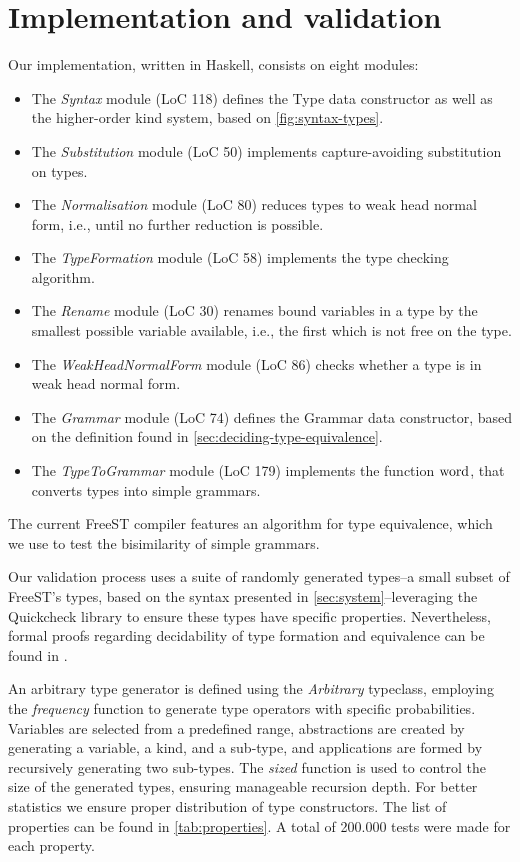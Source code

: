 \section{Implementation and validation}\label{sec:implementation}
Our implementation, written in Haskell, consists on eight modules:
\begin{itemize}
    \item The \emph{Syntax} module (LoC 118) defines the Type data constructor as well as the higher-order kind system, based on \cref*{fig:syntax-types}. 
    \item The \emph{Substitution} module (LoC 50) implements capture-avoiding substitution on types.
    \item The \emph{Normalisation} module (LoC 80) reduces types to weak head normal form, i.e., until no further reduction is possible.
    \item The \emph{TypeFormation} module (LoC 58) implements the type checking algorithm.
    \item The \emph{Rename} module (LoC 30) renames bound variables in a type by the smallest possible variable available, i.e., the first which is not free on the type.
    \item The \emph{WeakHeadNormalForm} module (LoC 86) checks whether a type is in weak head normal form. 
    \item The \emph{Grammar} module (LoC 74) defines the Grammar data constructor, based on the definition found in \cref*{sec:deciding-type-equivalence}.
    \item The \emph{TypeToGrammar} module (LoC 179) implements the function $\operatorname{word}$, that converts types into simple grammars.
\end{itemize}

The current FreeST compiler features an algorithm for type equivalence, which we use to test the bisimilarity of simple grammars.

Our validation process uses a suite of randomly generated types--a small subset of FreeST's types, based on the syntax presented in \cref*{sec:system}--leveraging the Quickcheck library\cite{DBLP:conf/icfp/ClaessenH00} to ensure these types have specific properties. Nevertheless, formal proofs regarding decidability of type formation and equivalence can be found in \cite{PocasCMV23}. 

An arbitrary type generator is defined using the \textit{Arbitrary} typeclass, employing the \textit{frequency} function to generate type operators with specific probabilities. Variables are selected from a predefined range, abstractions are created by generating a variable, a kind, and a sub-type, and applications are formed by recursively generating two sub-types. The \textit{sized} function is used to control the size of the generated types, ensuring manageable recursion depth. For better statistics we ensure proper distribution of type constructors. The list of properties can be found in \cref{tab:properties}. A total of 200.000 tests were made for each property.


